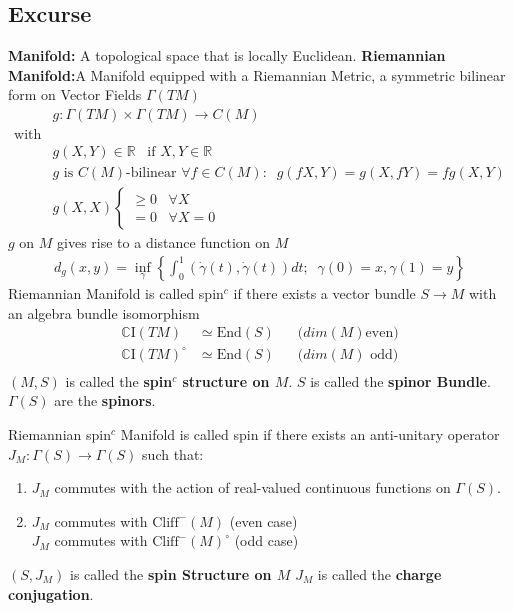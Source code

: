 \subsection{Excurse}
\textbf{Manifold:} A topological space that is locally Euclidean.
\newline
\textbf{Riemannian Manifold:}A Manifold equipped with a Riemannian
Metric, a
symmetric bilinear form on Vector Fields $\Gamma(TM)$
\begin{align}
    &g: \Gamma(TM) \times \Gamma(TM) \rightarrow C(M) \\
    \text{with}& \nonumber\\
    &g(X, Y) \in \mathbb{R} \;\;\; \text{if $X, Y \in \mathbb{R}$}\\
    &\text{$g$ is $C(M)$-bilinear } \forall f\in C(M):\;\; g(fX, Y) =
    g(X,
    fY) = fg(X,Y)\\
    &g(X,X) \begin{cases}\geq 0  \;\;\; \forall X \\ = 0 \;\;\; \forall X
        =0
    \end{cases}
\end{align}
$g$ on $M$ gives rise to a distance function on $M$
\begin{align}
    d_g(x, y) = \inf_\gamma \left\{\int_0^1(\dot{\gamma}(t),
    \dot{\gamma}(t))dt;\;\; \gamma(0) = x, \gamma(1) = y \right\}
\end{align}
Riemannian Manifold is called spin$^c$ if there exists a vector bundle $S
\rightarrow M$ with an algebra bundle isomorphism
\begin{align}
    \mathbb{C}\text{I}(TM) &\simeq \text{End}(S)\;\;\; &\text{($dim(M)$
    even)}\\
    \mathbb{C}\text{I}(TM)^\circ &\simeq \text{End}(S)\;\;\;
    &\text{($dim(M)$ odd)}\\
\end{align}
$(M,S)$ is called the \textbf{spin$^c$ structure on $M$}.
\newline
$S$ is called the \textbf{spinor Bundle}.
\newline
$\Gamma(S)$ are the \textbf{spinors}.

Riemannian spin$^c$ Manifold is called spin if there exists an
anti-unitary
operator $J_M:\Gamma(S) \rightarrow \Gamma(S)$ such that:
\begin{enumerate}
    \item $J_M$ commutes with the action of real-valued  continuous
        functions
        on $\Gamma(S)$.
    \item $J_M$ commutes with $\text{Cliff}^-(M)$ (even case)\\
    $J_M$ commutes with $\text{Cliff}^-(M)^\circ$ (odd case)
\end{enumerate}
$(S, J_M)$ is called the \textbf{spin Structure on $M$}
\newline
$J_M$ is called the \textbf{charge conjugation}.
